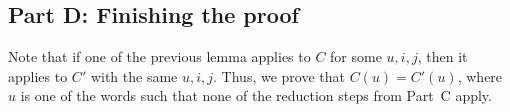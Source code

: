 \documentclass[submission]{FPSAC2018}
\theoremstyle{plain}
\theoremstyle{definition}
\numberwithin{equation}{section}
\begin{document}
\subsection*{Part D: Finishing the proof}

Note that if one of the previous lemma applies to $C$ for some $u,i,j$, then it applies to $C'$ with the same $u, i, j$.
Thus, we prove that $C(u) = C'(u)$, where $u$ is one of the words such that none of the reduction steps from Part~C apply.








%
%
%  
%
\end{document}
